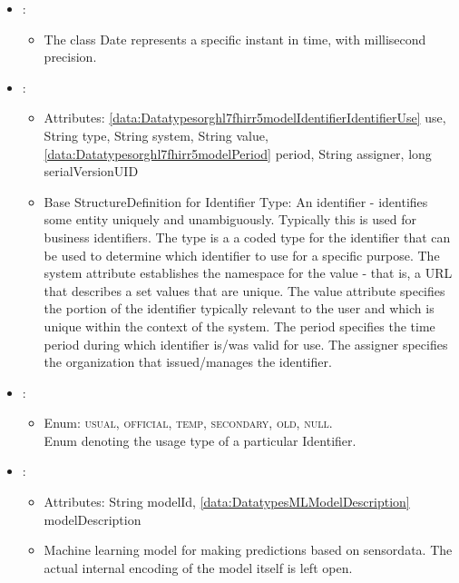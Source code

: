 \begin{itemize}[nolistsep,noitemsep]
\begin{itemize}[noitemsep,nolistsep]
\item[] Authentication object for making authenticated requests to the MLaaS service provider.
\end{itemize}

\item {}: 
\begin{itemize}[noitemsep,nolistsep]

\item[] The class Date represents a specific instant in time, with millisecond precision. 
\end{itemize}

\item {}: 
\begin{itemize}[noitemsep,nolistsep]
\item[] Attributes: \ref{data:Datatypesorghl7fhirr5modelIdentifierIdentifierUse} use, String type, String system, String value, \ref{data:Datatypesorghl7fhirr5modelPeriod} period, String assigner, long serialVersionUID
\item[] Base StructureDefinition for Identifier Type: An identifier - identifies some entity uniquely and unambiguously. Typically this is used for business identifiers.
The type is a a coded type for the identifier that can be used to determine which identifier to use for a specific purpose.
The system attribute establishes the namespace for the value - that is, a URL that describes a set values that are unique.
The value attribute specifies the portion of the identifier typically relevant to the user and which is unique within the context of the system.
The period specifies the time period during which identifier is/was valid for use.
The assigner specifies the organization that issued/manages the identifier.
\end{itemize}

\item {}: 
\begin{itemize}[noitemsep,nolistsep]

\item[] Enum: \textsc{usual}, \textsc{official}, \textsc{temp}, \textsc{secondary}, \textsc{old}, \textsc{null}.\\Enum denoting the usage type of a particular Identifier.
\end{itemize}

\item {}: 
\begin{itemize}[noitemsep,nolistsep]
\item[] Attributes: String modelId, \ref{data:DatatypesMLModelDescription} modelDescription
\item[] Machine learning model for making predictions based on sensordata.
The actual internal encoding of the model itself is left open.
\end{itemize}


\end{itemize}
